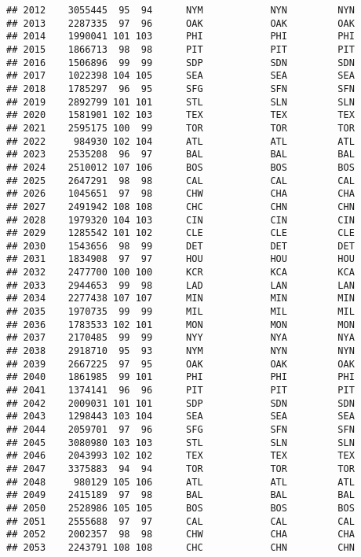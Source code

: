 \documentclass[]{article}
\begin{document}
\begin{verbatim}
## 2012    3055445  95  94      NYM            NYN         NYN
## 2013    2287335  97  96      OAK            OAK         OAK
## 2014    1990041 101 103      PHI            PHI         PHI
## 2015    1866713  98  98      PIT            PIT         PIT
## 2016    1506896  99  99      SDP            SDN         SDN
## 2017    1022398 104 105      SEA            SEA         SEA
## 2018    1785297  96  95      SFG            SFN         SFN
## 2019    2892799 101 101      STL            SLN         SLN
## 2020    1581901 102 103      TEX            TEX         TEX
## 2021    2595175 100  99      TOR            TOR         TOR
## 2022     984930 102 104      ATL            ATL         ATL
## 2023    2535208  96  97      BAL            BAL         BAL
## 2024    2510012 107 106      BOS            BOS         BOS
## 2025    2647291  98  98      CAL            CAL         CAL
## 2026    1045651  97  98      CHW            CHA         CHA
## 2027    2491942 108 108      CHC            CHN         CHN
## 2028    1979320 104 103      CIN            CIN         CIN
## 2029    1285542 101 102      CLE            CLE         CLE
## 2030    1543656  98  99      DET            DET         DET
## 2031    1834908  97  97      HOU            HOU         HOU
## 2032    2477700 100 100      KCR            KCA         KCA
## 2033    2944653  99  98      LAD            LAN         LAN
## 2034    2277438 107 107      MIN            MIN         MIN
## 2035    1970735  99  99      MIL            MIL         MIL
## 2036    1783533 102 101      MON            MON         MON
## 2037    2170485  99  99      NYY            NYA         NYA
## 2038    2918710  95  93      NYM            NYN         NYN
## 2039    2667225  97  95      OAK            OAK         OAK
## 2040    1861985  99 101      PHI            PHI         PHI
## 2041    1374141  96  96      PIT            PIT         PIT
## 2042    2009031 101 101      SDP            SDN         SDN
## 2043    1298443 103 104      SEA            SEA         SEA
## 2044    2059701  97  96      SFG            SFN         SFN
## 2045    3080980 103 103      STL            SLN         SLN
## 2046    2043993 102 102      TEX            TEX         TEX
## 2047    3375883  94  94      TOR            TOR         TOR
## 2048     980129 105 106      ATL            ATL         ATL
## 2049    2415189  97  98      BAL            BAL         BAL
## 2050    2528986 105 105      BOS            BOS         BOS
## 2051    2555688  97  97      CAL            CAL         CAL
## 2052    2002357  98  98      CHW            CHA         CHA
## 2053    2243791 108 108      CHC            CHN         CHN

\end{verbatim}
\end{document}
